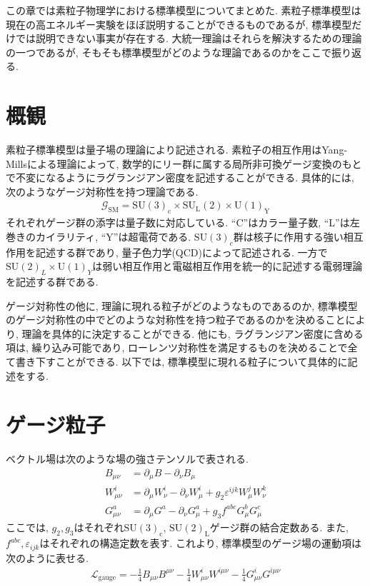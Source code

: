 %
%
この章では素粒子物理学における標準模型についてまとめた.
素粒子標準模型は現在の高エネルギー実験をほぼ説明することができるものであるが, 標準模型だけでは説明できない事実が存在する.
大統一理論はそれらを解決するための理論の一つであるが, そもそも標準模型がどのような理論であるのかをここで振り返る.
\section{概観}
素粒子標準模型は量子場の理論により記述される.
素粒子の相互作用はYang-Millsによる理論によって, 数学的にリー群に属する局所非可換ゲージ変換のもとで不変になるようにラグランジアン密度を記述することができる.
具体的には, 次のようなゲージ対称性を持つ理論である.
\begin{align}
  \mathcal{G}_{\text{SM}}=\mathrm{SU}(3)_\mathrm{c}\times \mathrm{SU}_\mathrm{L}(2)\times \mathrm{U}(1)_\mathrm{Y}\label{SM-Gauge}
\end{align}
それぞれゲージ群の添字は量子数に対応している.
``C''はカラー量子数, ``L''は左巻きのカイラリティ, ``Y''は超電荷である.
$\mathrm{SU}(3)_c$群は核子に作用する強い相互作用を記述する群であり, 量子色力学(QCD)によって記述される.
一方で$\mathrm{SU}(2)_L\times \mathrm{U}(1)_Y$は弱い相互作用と電磁相互作用を統一的に記述する電弱理論を記述する群である.

ゲージ対称性の他に, 理論に現れる粒子がどのようなものであるのか, 標準模型のゲージ対称性の中でどのような対称性を持つ粒子であるのかを決めることにより, 理論を具体的に決定することができる.
他にも, ラグランジアン密度に含める項は, 繰り込み可能であり, ローレンツ対称性を満足するものを決めることで全て書き下すことができる.
以下では, 標準模型に現れる粒子について具体的に記述をする.
\section{ゲージ粒子}

ベクトル場は次のような場の強さテンソルで表される.
\begin{align}
  B_{\mu\nu} &= \partial_\mu B - \partial_\nu B_\mu \label{gauge.B}\\
  W_{\mu\nu}^i &= \partial_\mu W_\nu^i - \partial_\nu W_\mu^i+g_2\varepsilon^{ijk}W_\mu^j W_\nu^k \label{gauge.W}\\
  G_{\mu\nu}^a &= \partial_\mu G^a - \partial_\nu G_\mu^a +g_3 f^{abc}G_\mu^b G_\mu^c\label{gauge.G}
\end{align}
ここでは, $g_2, g_3$はそれぞれ$\mathrm{SU}(3)_\mathrm{c}$, $\mathrm{SU}(2)_\mathrm{L}$ゲージ群の結合定数ある.
また, $f^{abc}, \varepsilon_{ijk} $はそれぞれの構造定数を表す.
これより, 標準模型のゲージ場の運動項は次のように表せる.
\begin{align}
  \mathcal{L}_{\text{gauge}} = -\frac{1}{4}B_{\mu\nu} B^{\mu\nu} - \frac{1}{4}W_{\mu\nu}^i W^{i\mu\nu} -\frac{1}{4}G_{\mu\nu}^i G^{i\mu\nu}\label{gauge.kin}
\end{align}
